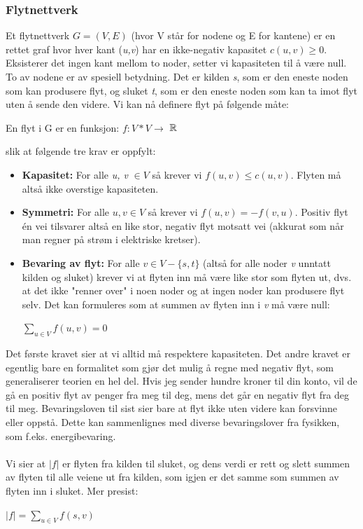 \subsubsection{Flytnettverk}
Et flytnettverk $G = (V,E)$ (hvor V står for nodene og E for kantene) er en rettet graf hvor hver kant (\textit{u,v}) har en ikke-negativ kapasitet $c(u,v) \geq 0$. Eksisterer det ingen kant mellom to noder, setter vi kapasiteten til å være null. To av nodene er av spesiell betydning. Det er kilden \textit{s}, som er den eneste noden som kan produsere flyt, og sluket \textit{t}, som er den eneste noden som kan ta imot flyt uten å sende den videre. Vi kan nå definere flyt på følgende måte:
\begin{center}
En flyt i G er en funksjon: $f: V * V \rightarrow$  ${\Bbb R}$
\end{center}

\noindent slik at følgende tre krav er oppfylt:
\begin{itemize}
    \item \textbf{Kapasitet:} For alle \textit{u, v} $\in V$ så krever vi $f (u,v) \leq c (u,v)$. Flyten må altså ikke overstige kapasiteten.
    \item \textbf{Symmetri:} For alle $u,v \in V$ så krever vi $f (u,v) = -f(v,u)$. Positiv flyt én vei tilsvarer altså en like stor, negativ flyt motsatt vei (akkurat som når man regner på strøm i elektriske kretser).
    \item \textbf{Bevaring av flyt:} For alle $v \in V - \{s,t\}$ (altså for alle noder \textit{v} unntatt kilden og sluket) krever vi at flyten inn må være like stor som flyten ut, dvs. at det ikke "renner over" i noen noder og at ingen noder kan produsere flyt selv. Det kan formuleres som at summen av flyten inn i \textit{v} må være null:
    \begin{center}
    $\sum\limits_{u \in V} f(u,v) = 0$ 
    \end{center}
\end{itemize}

\noindent Det første kravet sier at vi alltid må respektere kapasiteten. Det andre kravet er egentlig bare en formalitet som gjør det mulig å regne med negativ flyt, som generaliserer teorien en hel del. Hvis jeg sender hundre kroner til din konto, vil de gå en positiv flyt av penger fra meg til deg, mens det går en negativ flyt fra deg til meg. Bevaringsloven til sist sier bare at flyt ikke uten videre kan forsvinne eller oppstå. Dette kan sammenlignes med diverse bevaringslover fra fysikken, som f.eks. energibevaring.
\\\\
Vi sier at $|f|$ er flyten fra kilden til sluket, og dens verdi er rett og slett summen av flyten til alle veiene ut fra kilden, som igjen er det samme som summen av flyten inn i sluket. Mer presist:
\begin{center}
    $|f| = \sum\limits_{u \in V} f(s,v)$ 
    \end{center}
    
